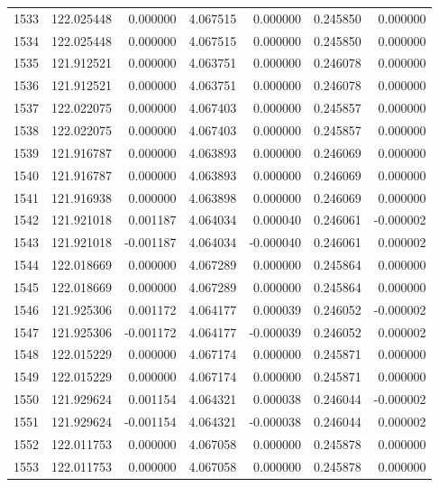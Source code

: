 \begin{tabular}{rrrrrrr}
1533 & 122.025448 &    0.000000 &  4.067515 &   0.000000 &   0.245850 &  0.000000 \\
1534 & 122.025448 &    0.000000 &  4.067515 &   0.000000 &   0.245850 &  0.000000 \\
1535 & 121.912521 &    0.000000 &  4.063751 &   0.000000 &   0.246078 &  0.000000 \\
1536 & 121.912521 &    0.000000 &  4.063751 &   0.000000 &   0.246078 &  0.000000 \\
1537 & 122.022075 &    0.000000 &  4.067403 &   0.000000 &   0.245857 &  0.000000 \\
1538 & 122.022075 &    0.000000 &  4.067403 &   0.000000 &   0.245857 &  0.000000 \\
1539 & 121.916787 &    0.000000 &  4.063893 &   0.000000 &   0.246069 &  0.000000 \\
1540 & 121.916787 &    0.000000 &  4.063893 &   0.000000 &   0.246069 &  0.000000 \\
1541 & 121.916938 &    0.000000 &  4.063898 &   0.000000 &   0.246069 &  0.000000 \\
1542 & 121.921018 &    0.001187 &  4.064034 &   0.000040 &   0.246061 & -0.000002 \\
1543 & 121.921018 &   -0.001187 &  4.064034 &  -0.000040 &   0.246061 &  0.000002 \\
1544 & 122.018669 &    0.000000 &  4.067289 &   0.000000 &   0.245864 &  0.000000 \\
1545 & 122.018669 &    0.000000 &  4.067289 &   0.000000 &   0.245864 &  0.000000 \\
1546 & 121.925306 &    0.001172 &  4.064177 &   0.000039 &   0.246052 & -0.000002 \\
1547 & 121.925306 &   -0.001172 &  4.064177 &  -0.000039 &   0.246052 &  0.000002 \\
1548 & 122.015229 &    0.000000 &  4.067174 &   0.000000 &   0.245871 &  0.000000 \\
1549 & 122.015229 &    0.000000 &  4.067174 &   0.000000 &   0.245871 &  0.000000 \\
1550 & 121.929624 &    0.001154 &  4.064321 &   0.000038 &   0.246044 & -0.000002 \\
1551 & 121.929624 &   -0.001154 &  4.064321 &  -0.000038 &   0.246044 &  0.000002 \\
1552 & 122.011753 &    0.000000 &  4.067058 &   0.000000 &   0.245878 &  0.000000 \\
1553 & 122.011753 &    0.000000 &  4.067058 &   0.000000 &   0.245878 &  0.000000 \\

\end{tabular}
